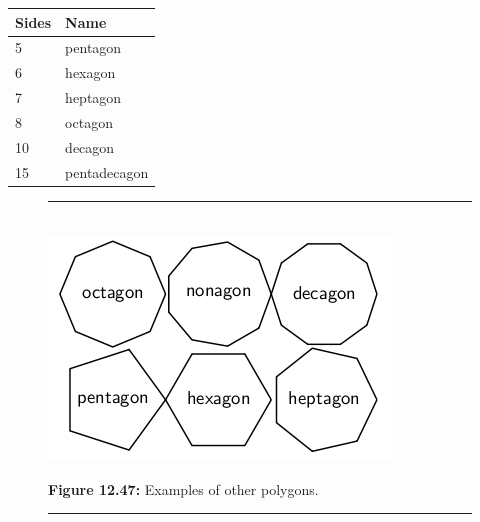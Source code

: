 \begin{table}[H]
\begin{center}

\begin{tabular}{|l|l|}\hline
Sides &
Name%
\\ \hline
5 &
pentagon%
\\ \hline
6 &
hexagon%
\\ \hline
7 &
heptagon%
\\ \hline
8 &
octagon%
\\ \hline
10 &
decagon%
\\ \hline
15 &
pentadecagon%
\\ \hline
\end{tabular}
\end{center}
\end{table}
\par
\setcounter{subfigure}{0}
\begin{figure}[H] %
\begin{center}
\rule[.1in]{\figurerulewidth}{.005in} \\
\label{m39368*uid93!!!underscore!!!media}\label{m39368*uid93!!!underscore!!!printimage}\includegraphics{col11306.imgs/m39368_MG10C13_046.png} %
\vspace{2pt}
\vspace{\rubberspace}\par \begin{cnxcaption}
\small \textbf{Figure 12.47: }Examples of other polygons.
\end{cnxcaption}
\vspace{.1in}
\rule[.1in]{\figurerulewidth}{.005in} \\
\end{center}
\end{figure}       

